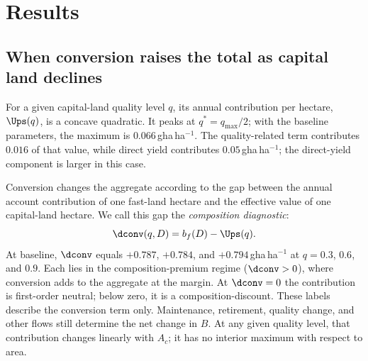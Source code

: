 \section{Results}\label{sec:results}

\subsection{When conversion raises the total as capital land declines}\label{sec:mask}

For a given capital-land quality level $q$, its annual contribution per hectare, $\Ups(q)$, is a concave quadratic. It peaks at $q^*=q_{\max}/2$; with the baseline parameters, the maximum is $0.066$\,gha\,ha$^{-1}$. The quality-related term contributes $0.016$ of that value, while direct yield contributes $0.05$\,gha\,ha$^{-1}$; the direct-yield component is larger in this case.

Conversion changes the aggregate according to the gap between the annual account contribution of one fast-land hectare and the effective value of one capital-land hectare. We call this gap the \emph{composition diagnostic}:
\begin{equation}\label{eq:dconv}
\dconv(q,D)=b_f(D)-\Ups(q).
\end{equation}
At baseline, $\dconv$ equals $+0.787$, $+0.784$, and $+0.794$\,gha\,ha$^{-1}$ at $q=0.3$, $0.6$, and $0.9$. Each lies in the composition-premium regime ($\dconv>0$), where conversion adds to the aggregate at the margin. At $\dconv=0$ the contribution is first-order neutral; below zero, it is a composition-discount. These labels describe the conversion term only. Maintenance, retirement, quality change, and other flows still determine the net change in $B$. At any given quality level, that contribution changes linearly with $A_c$; it has no interior maximum with respect to area.

